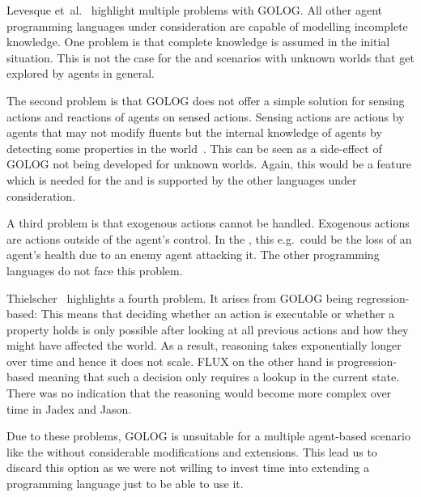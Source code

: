 Levesque et~al.~\cite{levesque_golog:_1997} highlight multiple problems with GOLOG.
All other agent programming languages under consideration are capable of modelling incomplete knowledge.
One problem is that complete knowledge is assumed in the initial situation.
This is not the case for the \mars{} and scenarios with unknown worlds that get explored by agents in general.

The second problem is that GOLOG does not offer a simple solution for sensing actions and reactions of agents on sensed actions.
Sensing actions are actions by agents that may not modify fluents but the internal knowledge of agents by detecting some properties in the world~\cite{thielscher_flux:_2005}.
This can be seen as a side-effect of GOLOG not being developed for unknown worlds.
Again, this would be a feature which is needed for the \mars{} and is supported by the other languages under consideration.

A third problem is that exogenous actions cannot be handled.
Exogenous actions are actions outside of the agent's control.
In the \mars{}, this e.g.\ could be the loss of an agent's health due to an enemy agent attacking it.
The other programming languages do not face this problem.

Thielscher~\cite{thielscher_flux:_2005} highlights a fourth problem.
It arises from GOLOG being regression-based:
This means that deciding whether an action is executable or whether a property holds is only possible after looking at all previous actions and how they might have affected the world.
As a result, reasoning takes exponentially longer over time and hence it does not scale.
FLUX on the other hand is progression-based meaning that such a decision only requires a lookup in the current state.
There was no indication that the reasoning would become more complex over time in Jadex and Jason.

Due to these problems, GOLOG is unsuitable for a multiple agent-based scenario like the \mars{} without considerable modifications and extensions.
This lead us to discard this option as we were not willing to invest time into extending a programming language just to be able to use it.

